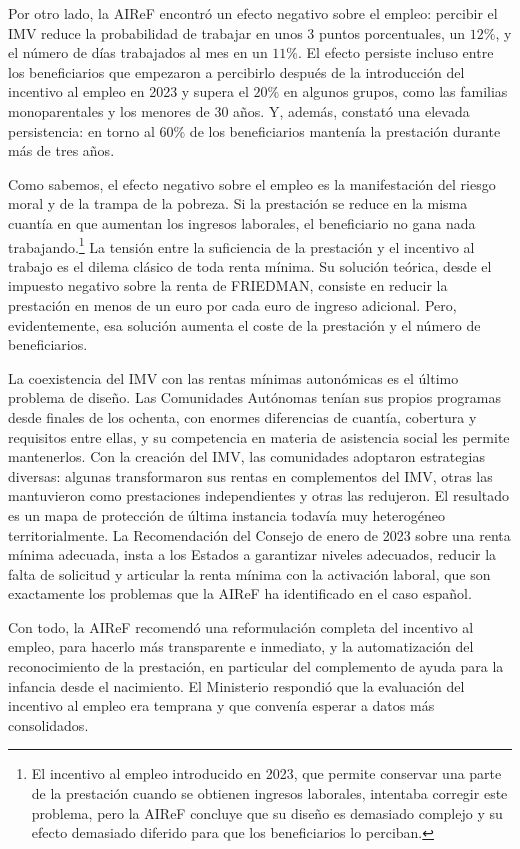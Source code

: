 \documentclass[10pt,a4paper]{article}
\begin{document}
Por otro lado, la AIReF encontró un efecto negativo sobre el empleo: percibir el IMV reduce la probabilidad de trabajar en unos $3$ puntos porcentuales, un $12\%$, y el número de días trabajados al mes en un $11\%$. El efecto persiste incluso entre los beneficiarios que empezaron a percibirlo después de la introducción del incentivo al empleo en 2023 y supera el $20\%$ en algunos grupos, como las familias monoparentales y los menores de $30$ años. Y, además, constató una elevada persistencia: en torno al $60\%$ de los beneficiarios mantenía la prestación durante más de tres años.

Como sabemos, el efecto negativo sobre el empleo es la manifestación del riesgo moral y de la trampa de la pobreza. Si la prestación se reduce en la misma cuantía en que aumentan los ingresos laborales, el beneficiario no gana nada trabajando.\footnote{%
    El incentivo al empleo introducido en 2023, que permite conservar una parte de la prestación cuando se obtienen ingresos laborales, intentaba corregir este problema, pero la AIReF concluye que su diseño es demasiado complejo y su efecto demasiado diferido para que los beneficiarios lo perciban.
} La tensión entre la suficiencia de la prestación y el incentivo al trabajo es el dilema clásico de toda renta mínima. Su solución teórica, desde el impuesto negativo sobre la renta de FRIEDMAN, consiste en reducir la prestación en menos de un euro por cada euro de ingreso adicional. Pero, evidentemente, esa solución aumenta el coste de la prestación y el número de beneficiarios.

La coexistencia del IMV con las rentas mínimas autonómicas es el último problema de diseño. Las Comunidades Autónomas tenían sus propios programas desde finales de los ochenta, con enormes diferencias de cuantía, cobertura y requisitos entre ellas, y su competencia en materia de asistencia social les permite mantenerlos. Con la creación del IMV, las comunidades adoptaron estrategias diversas: algunas transformaron sus rentas en complementos del IMV, otras las mantuvieron como prestaciones independientes y otras las redujeron. El resultado es un mapa de protección de última instancia todavía muy heterogéneo territorialmente. La Recomendación del Consejo de enero de 2023 sobre una renta mínima adecuada, insta a los Estados a garantizar niveles adecuados, reducir la falta de solicitud y articular la renta mínima con la activación laboral, que son exactamente los problemas que la AIReF ha identificado en el caso español.

Con todo, la AIReF recomendó una reformulación completa del incentivo al empleo, para hacerlo más transparente e inmediato, y la automatización del reconocimiento de la prestación, en particular del complemento de ayuda para la infancia desde el nacimiento. El Ministerio respondió que la evaluación del incentivo al empleo era temprana y que convenía esperar a datos más consolidados.
\end{document}
